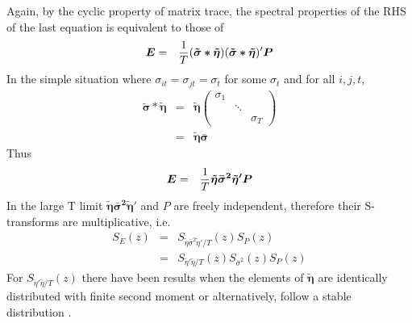 \documentclass{article}
\begin{document}
Again, by the cyclic property of matrix trace, the spectral properties
of the RHS of the last equation is equivalent to those of
\begin{eqnarray*}
  \bm E &=& {1 \over T} (\bm{\tilde{\sigma} * \tilde{\eta}}) (\bm{\tilde{\sigma}
    * \tilde{\eta}})' \bm P \\
\end{eqnarray*}
In the simple situation where $\sigma_{it} =
\sigma_{jt} = \sigma_t$ for some $\sigma_t$ and for all $i, j, t$,
\begin{eqnarray*}
  \bm{\tilde \sigma * \tilde \eta} &=& \bm{\tilde \eta}
  \begin{pmatrix}
    \sigma_1 &        & \\
        & \ddots & \\
        &        & \sigma_T
  \end{pmatrix} \\
  &=& \bm{\tilde \eta \bar \sigma}
\end{eqnarray*}
Thus
\begin{eqnarray}\label{eq:E_def}
  \bm E &=& {1 \over T}\bm{\tilde \eta \bar \sigma^2 \tilde \eta' P}
\end{eqnarray}
In the large T limit $\bm{\tilde \eta \bar \sigma^2 \tilde \eta'}$ and $P$ are
freely independent, therefore their S-transforms are multiplicative,
i.e.
\begin{eqnarray}
  S_E(z) &=& S_{\tilde \eta \bar \sigma^2 \tilde \eta'/T}(z) S_P(z)
  \nonumber \\
  &=& S_{\tilde \eta' \tilde \eta /T}(z) S_{\bar \sigma^2}(z) S_P(z) \label{eq:S_E}
\end{eqnarray}
For $S_{\tilde \eta' \tilde \eta /T}(z)$ there have been results when
the elements of $\bm{\tilde \eta}$ are identically distributed with finite
second moment \cite{burda2011} or alternatively, follow a stable
distribution \cite{politi2010}.
\end{document}
